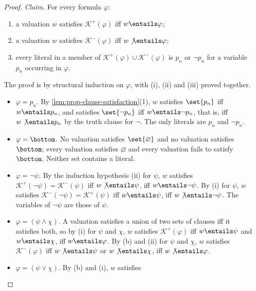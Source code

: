 \begin{proof}
\emph{Claim.}  For every formula \(\varphi\):
\begin{enumerate}
  \item[(i)] a valuation \(w\) satisfies \(\mathcal K^{+}(\varphi)\) iff
        \(w\entails\varphi\);
  \item[(ii)] a valuation \(w\) satisfies \(\mathcal K^{-}(\varphi)\) iff
        \(w\not\entails\varphi\);
  \item[(iii)] every literal in a member of
        \(\mathcal K^{+}(\varphi)\cup\mathcal K^{-}(\varphi)\) is \(p_n\) or
        \(\neg p_n\) for a variable \(p_n\) occurring in \(\varphi\).
\end{enumerate}
The proof is by structural induction on \(\varphi\), with (i), (ii) and
(iii) proved together.
\begin{itemize}
  \item \(\varphi=p_n\).  By \cref{lem:prop-clause-satisfaction}(1),
        \(w\) satisfies \(\set{p_n}\) iff \(w\entails p_n\), and satisfies
        \(\set{\neg p_n}\) iff \(w\entails\neg p_n\), that is, iff
        \(w\not\entails p_n\) by the truth clause for \(\neg\).  The only
        literals are \(p_n\) and \(\neg p_n\).
  \item \(\varphi=\bottom\).  No valuation satisfies
        \(\set{\varnothing}\) and no valuation satisfies \(\bottom\); every
        valuation satisfies \(\varnothing\) and every valuation fails to
        satisfy \(\bottom\).  Neither set contains a literal.
  \item \(\varphi=\neg\psi\).  By the induction hypothesis (ii) for
        \(\psi\), \(w\) satisfies \(\mathcal K^{+}(\neg\psi)=\mathcal K^{-}(\psi)\)
        iff \(w\not\entails\psi\), iff \(w\entails\neg\psi\).  By (i) for
        \(\psi\), \(w\) satisfies \(\mathcal K^{-}(\neg\psi)=\mathcal K^{+}(\psi)\)
        iff \(w\entails\psi\), iff \(w\not\entails\neg\psi\).  The variables
        of \(\neg\psi\) are those of \(\psi\).
  \item \(\varphi=(\psi\land\chi)\).  A valuation satisfies a union of two
        sets of clauses iff it satisfies both, so by (i) for \(\psi\) and
        \(\chi\), \(w\) satisfies \(\mathcal K^{+}(\varphi)\) iff
        \(w\entails\psi\) and \(w\entails\chi\), iff \(w\entails\varphi\).
        By (b) and (ii) for \(\psi\) and \(\chi\), \(w\) satisfies
        \(\mathcal K^{-}(\varphi)\) iff \(w\not\entails\psi\) or
        \(w\not\entails\chi\), iff \(w\not\entails\varphi\).
  \item \(\varphi=(\psi\lor\chi)\).  By (b) and (i), \(w\) satisfies

\end{itemize}
\end{proof}
